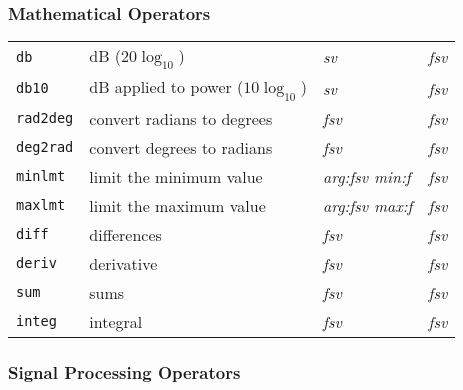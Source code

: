 \subsubsection{Mathematical Operators}

\begin{tabular}{p{.8in}p{2.5in}p{1.0in}p{.75in}}
{\tt db} & dB ($20 \log_{10}$) & {\it sv} & {\it fsv} \\
{\tt db10} & dB applied to power ($10 \log_{10}$) & {\it sv}
    & {\it fsv} \\
{\tt rad2deg} & convert radians to degrees & {\it fsv} & {\it fsv} \\
{\tt deg2rad} & convert degrees to radians & {\it fsv} & {\it fsv} \\
{\tt minlmt} & limit the minimum value & {\it arg:fsv \newline min:f}
    & {\it fsv} \\
{\tt maxlmt} & limit the maximum value & {\it arg:fsv \newline max:f}
    & {\it fsv} \\
{\tt diff} & differences & {\it fsv} & {\it fsv} \\
{\tt deriv} & derivative & {\it fsv} & {\it fsv} \\
{\tt sum} & sums & {\it fsv} & {\it fsv} \\
{\tt integ} & integral & {\it fsv} & {\it fsv}
\end{tabular}

\subsubsection{Signal Processing Operators}


